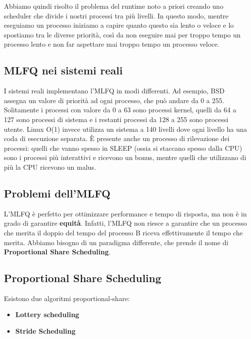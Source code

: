 \documentclass[11pt, a4paper, titlepage, oneside]{scrbook}
\begin{document}
Abbiamo quindi risolto il problema del runtime noto a priori creando uno scheduler che divide i nostri processi tra più livelli. In questo modo, mentre eseguiamo un processo iniziamo a capire quanto questo sia lento o veloce e lo spostiamo tra le diverse priorità, così da non eseguire mai per troppo tempo un processo lento e non far aspettare mai troppo tempo un processo veloce. 

\subsection*{MLFQ nei sistemi reali}

I sistemi reali implementano l'MLFQ in modi differenti. Ad esempio, BSD assegna un valore di priorità ad ogni processo, che può andare da 0 a 255. Solitamente i processi con valore da 0 a 63 sono processi kernel, quelli da 64 a 127 sono processi di sistema e i restanti processi da 128 a 255 sono processi utente. Linux O(1) invece utilizza un sistema a 140 livelli dove ogni livello ha una coda di esecuzione separata. È presente anche un processo di rilevazione dei processi: quelli che vanno spesso in SLEEP (ossia si staccano spesso dalla CPU) sono i processi più interattivi e ricevono un bonus, mentre quelli che utilizzano di più la CPU ricevono un malus. 

\subsection*{Problemi dell'MLFQ}

L'MLFQ è perfetto per ottimizzare performance e tempo di risposta, ma non è in grado di garantire \textbf{equità}. Infatti, l'MLFQ non riesce a garantire che un processo che merita il doppio del tempo del processo B riceva effettivamente il tempo che merita. Abbiamo bisogno di un paradigma differente, che prende il nome di \textbf{Proportional Share Scheduling}.

\subsection{Proportional Share Scheduling}

Esistono due algoritmi proportional-share:
\begin{itemize}
    \item \textbf{Lottery scheduling}
    \item \textbf{Stride Scheduling}
\end{itemize}
\end{document}
